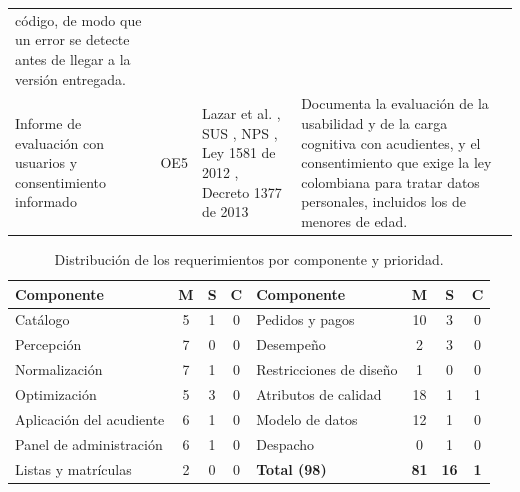 \begin{table}[H]
\begin{tabularx}{\textwidth}{@{}p{3cm}p{1.4cm}p{3.2cm}X@{}}
código, de modo que un error se detecte antes de llegar a la versión entregada. \\
Informe de evaluación con usuarios y consentimiento informado & OE5 &
Lazar et al. \citep{lazar_research_2017}, SUS \citep{brooke_sus_1996}, NPS
\citep{reichheld_one_2003}, Ley 1581 de 2012 \citep{congreso_ley1581_2012}, Decreto 1377
de 2013 \citep{presidencia_decreto1377_2013} &
Documenta la evaluación de la usabilidad y de la carga cognitiva con acudientes, y el
consentimiento que exige la ley colombiana para tratar datos personales, incluidos los de
menores de edad. \\
\bottomrule
\end{tabularx}
\end{table}

\begin{table}[H]
\centering\footnotesize
\setlength{\tabcolsep}{4pt}
\renewcommand{\arraystretch}{1.15}
\caption{Distribución de los requerimientos por componente y prioridad.}
\label{tab:moscow}
\begin{tabular}{@{}lccclccc@{}}
\toprule
\textbf{Componente} & \textbf{M} & \textbf{S} & \textbf{C} &
\textbf{Componente} & \textbf{M} & \textbf{S} & \textbf{C} \\
\midrule
Catálogo & 5 & 1 & 0 & Pedidos y pagos & 10 & 3 & 0 \\
Percepción & 7 & 0 & 0 & Desempeño & 2 & 3 & 0 \\
Normalización & 7 & 1 & 0 & Restricciones de diseño & 1 & 0 & 0 \\
Optimización & 5 & 3 & 0 & Atributos de calidad & 18 & 1 & 1 \\
Aplicación del acudiente & 6 & 1 & 0 & Modelo de datos & 12 & 1 & 0 \\
Panel de administración & 6 & 1 & 0 & Despacho & 0 & 1 & 0 \\
Listas y matrículas & 2 & 0 & 0 & \textbf{Total (98)} & \textbf{81} & \textbf{16} &
\textbf{1} \\
\bottomrule
\end{tabular}
\end{table}

